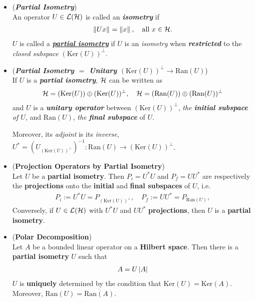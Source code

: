 \documentclass[11pt]{article}
\begin{document}
\begin{itemize}
\item \begin{definition} (\emph{\textbf{Partial Isometry}})\\
An operator $U \in {\mathcal L}({\mathcal H})$ is called an \emph{\textbf{isometry}} if 
\begin{align*}
\left\|Ux\right\|_{} = \left\|x\right\|_{}, \quad \text{all $x \in {\mathcal H}$.}
\end{align*}
$U$ is called a \underline{\emph{\textbf{partial isometry}}} if $U$ is an \emph{isometry} when \emph{\textbf{restricted}}  to the \emph{closed subspace} $(\text{Ker}(U))^{\bot}$.  
\end{definition}

\item \begin{remark} (\emph{\textbf{Partial Isometry $=$ Unitary $(\text{Ker}(U))^{\bot} \rightarrow \text{Ran}(U)$}})\\
If $U$ is a \emph{\textbf{partial isometry}},  ${\mathcal H}$ can be written as 
\begin{align*}
{\mathcal H} =(\text{Ker}(U)) \oplus (\text{Ker}(U))^{\bot}, \quad {\mathcal H} =(\text{Ran}(U)) \oplus (\text{Ran}(U))^{\bot}
\end{align*}
and $U$ is a \emph{\textbf{unitary operator}} between $(\text{Ker}(U))^{\bot}$, \emph{the \textbf{initial subspace} of $U$}, and $\text{Ran}(U)$, \emph{the \textbf{final subspace}} of $U$. 

Moreover, its \emph{adjoint} is its \emph{inverse}, $U^{*} = (U_{(\text{Ker}(U))^{\bot}})^{-1}: \text{Ran}(U) \rightarrow (\text{Ker}(U))^{\bot}$.
\end{remark}

\item \begin{proposition} (\textbf{Projection Operators by Partial Isometry}) \citep{reed1980methods}\\
Let $U$ be a \textbf{partial isometry}.  Then $P_i =  U^{*}U$ and $P_f =  UU^{*}$ are respectively the \textbf{projections} onto the \textbf{initial} and \textbf{final subspaces} of $U$, i.e.
\begin{align*}
P_i := U^{*}U = P_{(\text{Ker}(U))^{\bot}}, \quad P_f := UU^{*} = P_{\text{Ran}(U) },
\end{align*}
Conversely, if $U \in {\mathcal L}({\mathcal H})$ with $U^{*}U$ and $UU^{*}$ \textbf{projections}, then $U$ is a \textbf{partial isometry}. 
\end{proposition}


\item \begin{theorem} (\textbf{Polar Decomposition})  \citep{reed1980methods}\\ 
Let $A$ be a bounded linear  operator on a \textbf{Hilbert space}. Then there is a \textbf{partial isometry} $U$ such that 
\begin{align*}
A = U\left\lvert A \right\rvert
\end{align*} $U$ is \textbf{uniquely} determined by the condition that $\text{Ker}(U) = \text{Ker}(A)$.  Moreover, $\text{Ran}(U) = \overline{\text{Ran}(A)}$. 
\end{theorem}
\end{itemize}
\end{document}
